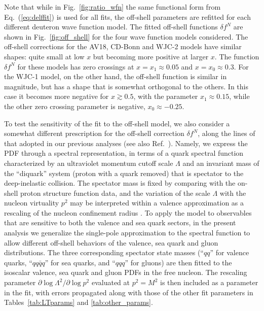 \documentclass[aps,prd,amsmath,preprint]{revtex4}
\begin{document}
Note that while in Fig.~\ref{fig:ratio_wfn} the same functional form
from Eq.~(\ref{eq:delffit}) is used for all fits, the off-shell
parameters are refitted for each different deuteron wave function
model.  The fitted off-shell functions $\delta f^N$ are shown in
Fig.~\ref{fig:off_shell} for the four wave function models considered.
The off-shell corrections for the AV18, CD-Bonn and WJC-2 models have
similar shapes: quite small at low $x$ but becoming more positive at
larger $x$.  The function $\delta f^N$ for these models has zero
crossings at $x = x_1 \approx 0.05$ and $x = x_0 \approx 0.3$.
For the WJC-1 model, on the other hand, the off-shell function is
similar in magnitude, but has a shape that is somewhat orthogonal
to the others.  In this case it becomes more negative for
$x \gtrsim 0.5$, with the parameter $x_1 \approx 0.15$, while the
other zero crossing parameter is negative, $x_0 \approx -0.25$.


To test the sensitivity of the fit to the off-shell model, we also
consider a somewhat different prescription for the off-shell
correction $\delta f^N$, along the lines of that adopted in our
previous analyses \cite{CJ11, CJ12} (see also Ref.~\cite{KP06}).
Namely, we express the PDF through a spectral representation, in
terms of a quark spectral function characterized by an ultraviolet
momentum cutoff scale $\Lambda$ and an invariant mass of the
``diquark'' system (proton with a quark removed) that is spectator
to the deep-inelastic collision.  The spectator mass is fixed by
comparing with the on-shell proton structure function data, and
the variation of the scale $\Lambda$ with the nucleon virtuality
$p^2$ may be interpreted within a valence approximation as a
rescaling of the nucleon confinement radius \cite{KP06}.
%
To apply the model to observables that are sensitive to both the
valence and sea quark sectors, in the present analysis we generalize
the single-pole approximation to the spectral function to allow
different off-shell behaviors of the valence, sea quark and gluon
distributions.  The three corresponding spectator state masses
(``$qq$'' for valence quarks, ``$qq\bar q q$'' for sea quarks,
and ``$qqq$'' for gluons) are then fitted to the isoscalar
valence, sea quark and gluon PDFs in the free nucleon.
The rescaling parameter $\partial \log\Lambda^2 / \partial \log p^2$
evaluated at $p^2=M^2$ is then included as a parameter in the fit,
with errors propagated along with those of the other fit parameters
in Tables~\ref{tab:LTparams} and \ref{tab:other_params}.
\end{document}
